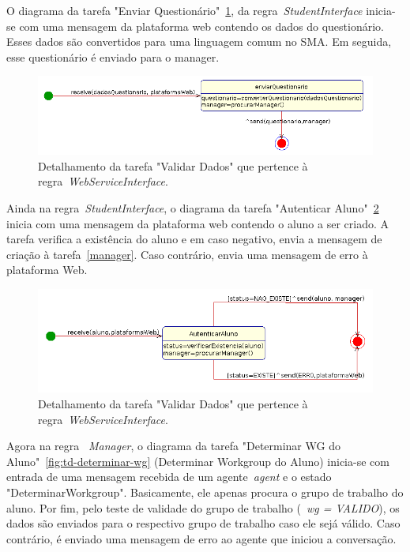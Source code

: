 O diagrama da tarefa "Enviar Questionário"~\ref{fig:td-enviar-quest}, da regra~\emph{StudentInterface} inicia-se com uma mensagem da plataforma web contendo os dados do questionário. Esses dados são convertidos para uma linguagem comum no SMA. Em seguida, esse questionário é enviado para o manager.

\begin{figure}
	\centering
	\includegraphics[scale=0.48]{images/td-enviar-quest.png}
	\caption{Detalhamento da tarefa "Validar Dados" que pertence à regra~\emph{WebServiceInterface}.}
	\label{fig:td-enviar-quest}
\end{figure}

Ainda na regra~\emph{StudentInterface}, o diagrama da tarefa "Autenticar Aluno"~\ref{fig:td-autenticar-aluno} inicia com uma mensagem da plataforma web contendo o aluno a ser criado. A tarefa verifica a existência do aluno e em caso negativo, envia a mensagem de criação à tarefa~\ref{manager}. Caso contrário, envia uma mensagem de erro à plataforma Web.

\begin{figure}
	\centering
	\includegraphics[scale=0.48]{images/td-autenticar-aluno.png}
	\caption{Detalhamento da tarefa "Validar Dados" que pertence à regra~\emph{WebServiceInterface}.}
	\label{fig:td-autenticar-aluno}
\end{figure}

Agora na regra ~\emph{Manager}, o diagrama da tarefa "Determinar WG do Aluno"~\ref{fig:td-determinar-wg} (Determinar Workgroup do Aluno) inicia-se com entrada de uma mensagem recebida de um agente~\emph{agent} e o estado "DeterminarWorkgroup". Basicamente, ele apenas procura o grupo de trabalho do aluno. Por fim, pelo teste de validade do grupo de trabalho (~\emph{wg = VALIDO}), os dados são enviados para o respectivo grupo de trabalho caso ele sejá válido. Caso contrário, é enviado uma mensagem de erro ao agente que iniciou a conversação.

